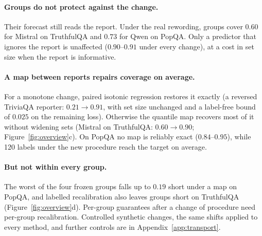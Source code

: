 \documentclass[11pt]{article}
\theoremstyle{definition}
\theoremstyle{remark}
\newcommand{\1}{\mathbf{1}}
\begin{document}
\paragraph{Groups do not protect against the change.}  Their forecast still reads the report. Under the real
rewording, groups cover $0.60$ for Mistral on TruthfulQA and $0.73$ for Qwen on PopQA. Only a predictor that
ignores the report is unaffected ($0.90$--$0.91$ under every change), at a cost in set size when the report is
informative.

\paragraph{A map between reports repairs coverage on average.}  For a monotone change, paired isotonic regression
restores it exactly (a reversed TriviaQA reporter: $0.21\to0.91$, with set size unchanged and a label-free bound
of $0.025$ on the remaining loss). Otherwise the quantile map recovers most of it without widening sets
(Mistral on TruthfulQA: $0.60\to0.90$; Figure~\ref{fig:overview}c). On PopQA no map is reliably exact
($0.84$--$0.95$), while 120 labels under the new procedure reach the target on average.

\paragraph{But not within every group.}  The worst of the four frozen groups falls up to $0.19$ short under a map
on PopQA, and labelled recalibration also leaves groups short on TruthfulQA (Figure~\ref{fig:overview}d).
Per-group guarantees after a change of procedure need per-group recalibration. Controlled synthetic changes,
the same shifts applied to every method, and further controls are in Appendix~\ref{app:transport}.
\end{document}
